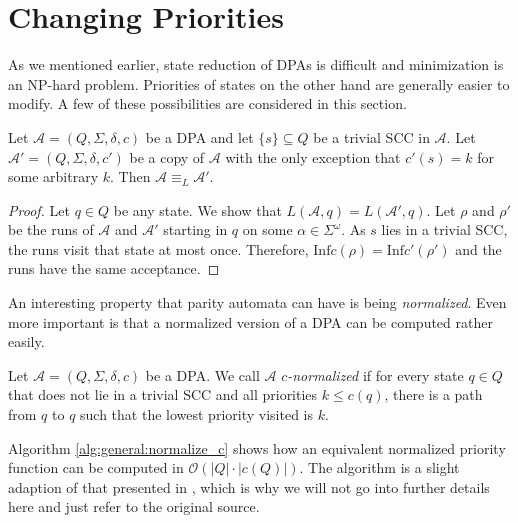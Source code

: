 \section{Changing Priorities}
As we mentioned earlier, state reduction of DPAs is difficult and minimization is an NP-hard problem. Priorities of states on the other hand are generally easier to modify. A few of these possibilities are considered in this section.

\begin{lem}
\label{lem:general:trivial_scc_dont_matter}
	Let $\mathcal{A} = (Q, \Sigma, \delta, c)$ be a DPA and let $\{s\} \subseteq Q$ be a trivial SCC in $\mathcal{A}$. Let $\mathcal{A}' = (Q, \Sigma, \delta, c')$ be a copy of $\mathcal{A}$ with the only exception that $c'(s) = k$ for some arbitrary $k$. Then $\mathcal{A} \equiv_L \mathcal{A}'$.
\end{lem}

\begin{proof}
	Let $q \in Q$ be any state. We show that $L(\mathcal{A}, q) = L(\mathcal{A}', q)$. Let $\rho$ and $\rho'$ be the runs of $\mathcal{A}$ and $\mathcal{A}'$ starting in $q$ on some $\alpha \in \Sigma^\omega$. As $s$ lies in a trivial SCC, the runs visit that state at most once. Therefore, $\text{Inf} c(\rho) = \text{Inf} c'(\rho')$ and the runs have the same acceptance.
\end{proof}

\vspace{10pt}

An interesting property that parity automata can have is being \emph{normalized}. Even more important is that a normalized version of a DPA can be computed rather easily.

\begin{defn}
	Let $\mathcal{A} = (Q, \Sigma, \delta, c)$ be a DPA. We call $\mathcal{A}$ \emph{$c$-normalized} if for every state $q \in Q$ that does not lie in a trivial SCC and all priorities $k \leq c(q)$, there is a path from $q$ to $q$ such that the lowest priority visited is $k$.
\end{defn}


Algorithm \ref{alg:general:normalize_c} shows how an equivalent normalized priority function can be computed in $\mathcal{O}(|Q| \cdot |c(Q)|)$. The algorithm is a slight adaption of that presented in \cite{CartonMaceiras99}, which is why we will not go into further details here and just refer to the original source.


